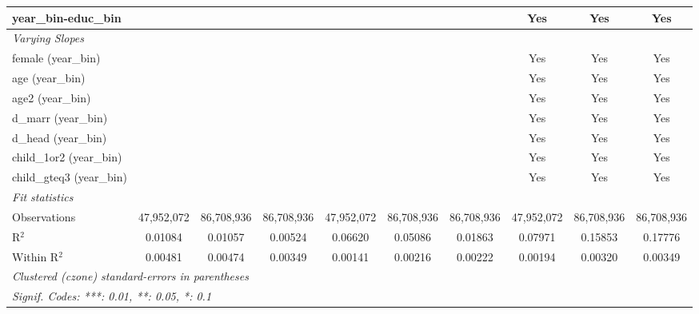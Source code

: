 \begin{tabular}{lccccccccc}
year\_bin-educ\_bin &  &  &  &  &  &  & Yes & Yes & Yes\\
\midrule \emph{Varying Slopes}&   &   &   &   &   &   &   &   &  \\
female (year\_bin) &  &  &  &  &  &  & Yes & Yes & Yes\\
age (year\_bin) &  &  &  &  &  &  & Yes & Yes & Yes\\
age2 (year\_bin) &  &  &  &  &  &  & Yes & Yes & Yes\\
d\_marr (year\_bin) &  &  &  &  &  &  & Yes & Yes & Yes\\
d\_head (year\_bin) &  &  &  &  &  &  & Yes & Yes & Yes\\
child\_1or2 (year\_bin) &  &  &  &  &  &  & Yes & Yes & Yes\\
child\_gteq3 (year\_bin) &  &  &  &  &  &  & Yes & Yes & Yes\\
\midrule \emph{Fit statistics}&  & & & & & & & & \\
Observations & 47,952,072&86,708,936&86,708,936&47,952,072&86,708,936&86,708,936&47,952,072&86,708,936&86,708,936\\
R$^2$ & 0.01084&0.01057&0.00524&0.06620&0.05086&0.01863&0.07971&0.15853&0.17776\\
Within R$^2$ & 0.00481&0.00474&0.00349&0.00141&0.00216&0.00222&0.00194&0.00320&0.00349\\
\midrule\midrule\multicolumn{10}{l}{\emph{Clustered (czone) standard-errors in parentheses}}\\
\multicolumn{10}{l}{\emph{Signif. Codes: ***: 0.01, **: 0.05, *: 0.1}}\\
\end{tabular}


